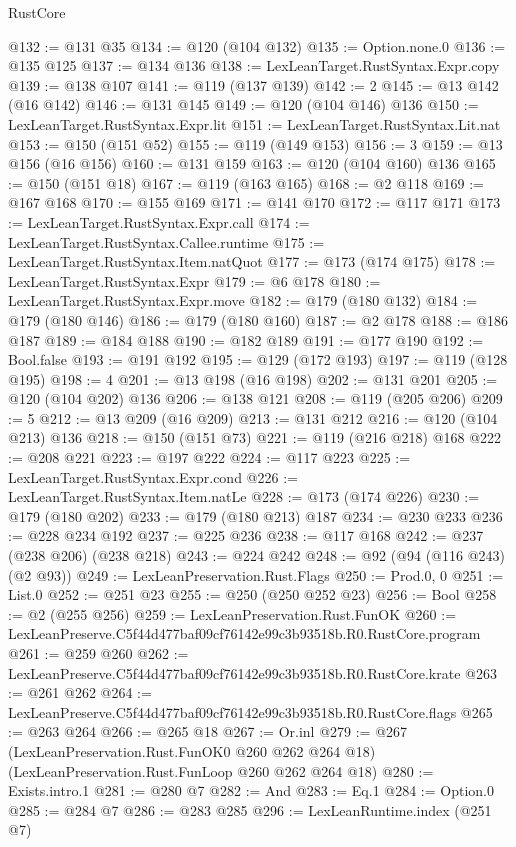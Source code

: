 \begin{lexlean}{RustCore}
\begin{coremodule}
@132 := @131 @35
@134 := @120 (@104 @132)
@135 := Option.none.{0}
@136 := @135 @125
@137 := @134 @136
@138 := LexLeanTarget.RustSyntax.Expr.copy
@139 := @138 @107
@141 := @119 (@137 @139)
@142 := 2
@145 := @13 @142 (@16 @142)
@146 := @131 @145
@149 := @120 (@104 @146) @136
@150 := LexLeanTarget.RustSyntax.Expr.lit
@151 := LexLeanTarget.RustSyntax.Lit.nat
@153 := @150 (@151 @52)
@155 := @119 (@149 @153)
@156 := 3
@159 := @13 @156 (@16 @156)
@160 := @131 @159
@163 := @120 (@104 @160) @136
@165 := @150 (@151 @18)
@167 := @119 (@163 @165)
@168 := @2 @118
@169 := @167 @168
@170 := @155 @169
@171 := @141 @170
@172 := @117 @171
@173 := LexLeanTarget.RustSyntax.Expr.call
@174 := LexLeanTarget.RustSyntax.Callee.runtime
@175 := LexLeanTarget.RustSyntax.Item.natQuot
@177 := @173 (@174 @175)
@178 := LexLeanTarget.RustSyntax.Expr
@179 := @6 @178
@180 := LexLeanTarget.RustSyntax.Expr.move
@182 := @179 (@180 @132)
@184 := @179 (@180 @146)
@186 := @179 (@180 @160)
@187 := @2 @178
@188 := @186 @187
@189 := @184 @188
@190 := @182 @189
@191 := @177 @190
@192 := Bool.false
@193 := @191 @192
@195 := @129 (@172 @193)
@197 := @119 (@128 @195)
@198 := 4
@201 := @13 @198 (@16 @198)
@202 := @131 @201
@205 := @120 (@104 @202) @136
@206 := @138 @121
@208 := @119 (@205 @206)
@209 := 5
@212 := @13 @209 (@16 @209)
@213 := @131 @212
@216 := @120 (@104 @213) @136
@218 := @150 (@151 @73)
@221 := @119 (@216 @218) @168
@222 := @208 @221
@223 := @197 @222
@224 := @117 @223
@225 := LexLeanTarget.RustSyntax.Expr.cond
@226 := LexLeanTarget.RustSyntax.Item.natLe
@228 := @173 (@174 @226)
@230 := @179 (@180 @202)
@233 := @179 (@180 @213) @187
@234 := @230 @233
@236 := @228 @234 @192
@237 := @225 @236
@238 := @117 @168
@242 := @237 (@238 @206) (@238 @218)
@243 := @224 @242
@248 := @92 (@94 (@116 @243) (@2 @93))
@249 := LexLeanPreservation.Rust.Flags
@250 := Prod.{0, 0}
@251 := List.{0}
@252 := @251 @23
@255 := @250 (@250 @252 @23)
@256 := Bool
@258 := @2 (@255 @256)
@259 := LexLeanPreservation.Rust.FunOK
@260 := LexLeanPreserve.C5f44d477baf09cf76142e99c3b93518b.R0.RustCore.program
@261 := @259 @260
@262 := LexLeanPreserve.C5f44d477baf09cf76142e99c3b93518b.R0.RustCore.krate
@263 := @261 @262
@264 := LexLeanPreserve.C5f44d477baf09cf76142e99c3b93518b.R0.RustCore.flags
@265 := @263 @264
@266 := @265 @18
@267 := Or.inl
@279 := @267
    (LexLeanPreservation.Rust.FunOK0 @260 @262 @264 @18)
    (LexLeanPreservation.Rust.FunLoop @260 @262 @264 @18)
@280 := Exists.intro.{1}
@281 := @280 @7
@282 := And
@283 := Eq.{1}
@284 := Option.{0}
@285 := @284 @7
@286 := @283 @285
@296 := LexLeanRuntime.index
    (@251 @7)

\end{coremodule}
\end{lexlean}
